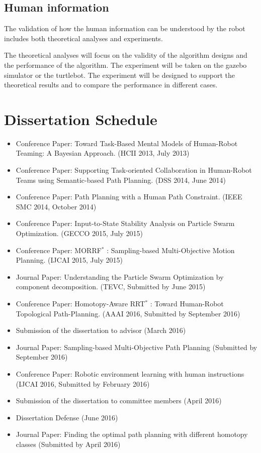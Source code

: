 \documentclass[phd]{byuprop}
\begin{document}
\subsection{Human information}

The validation of how the human information can be understood by the robot includes both theoretical analyses and experiments.

The theoretical analyses will focus on the validity of the algorithm designs and the performance of the algorithm.
The experiment will be taken on the gazebo simulator or the turtlebot.
The experiment will be designed to support the theoretical results and to compare the performance in different cases.


\section{Dissertation Schedule}

\begin{itemize}
\item Conference Paper: Toward Task-Based Mental Models of Human-Robot Teaming: A Bayesian Approach. (HCII 2013, July 2013)
\item Conference Paper: Supporting Task-oriented Collaboration in Human-Robot Teams using Semantic-based Path Planning. (DSS 2014, June 2014)
\item Conference Paper: Path Planning with a Human
Path Constraint. (IEEE SMC 2014, October 2014)
\item Conference Paper: Input-to-State Stability Analysis on Particle Swarm Optimization. (GECCO 2015, July 2015)
\item Conference Paper: MORRF$^{*}$ : Sampling-based Multi-Objective Motion Planning. (IJCAI 2015, July 2015)
\item Journal Paper: Understanding the Particle Swarm Optimization by component decomposition. (TEVC, Submitted by June 2015)
\item Conference Paper: Homotopy-Aware RRT$^{*}$ : Toward Human-Robot Topological Path-Planning. (AAAI 2016, Submitted by September 2016)
\item Submission of the dissertation to advisor (March 2016)
\item Journal Paper: Sampling-based Multi-Objective Path Planning (Submitted by September 2016)
\item Conference Paper: Robotic environment learning with human instructions (IJCAI 2016, Submitted by February 2016)
\item Submission of the dissertation to committee members (April 2016)
\item Dissertation Defense (June 2016)
\item Journal Paper: Finding the optimal path planning with different homotopy classes (Submitted by April 2016)
\end{itemize}



\end{document}
